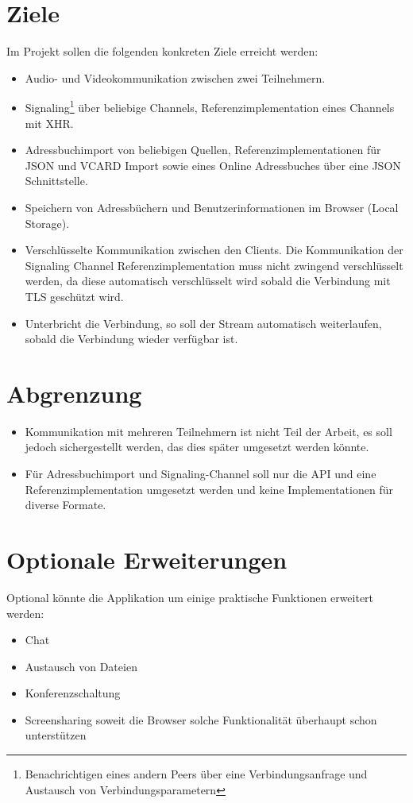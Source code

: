 	\section{Ziele}
		Im Projekt sollen die folgenden konkreten Ziele erreicht werden:
		\begin{itemize}
			\item Audio- und Videokommunikation zwischen zwei Teilnehmern.
			\item Signaling\footnote{Benachrichtigen eines andern Peers über eine Verbindungsanfrage und Austausch von Verbindungsparametern} über beliebige Channels, Referenzimplementation eines Channels mit XHR.
			\item Adressbuchimport von beliebigen Quellen, Referenzimplementationen für JSON und VCARD Import sowie eines Online Adressbuches über eine JSON Schnittstelle.
			\item Speichern von Adressbüchern und Benutzerinformationen im Browser (Local Storage\cite{MDN-LocalStorage}).
			\item Verschlüsselte Kommunikation zwischen den Clients. Die Kommunikation der Signaling Channel Referenzimplementation muss nicht zwingend verschlüsselt werden, da diese automatisch verschlüsselt wird sobald die Verbindung mit TLS geschützt wird.
			\item Unterbricht die Verbindung, so soll der Stream automatisch weiterlaufen, sobald die Verbindung wieder verfügbar ist.
		\end{itemize}
		
	\section{Abgrenzung}
		\begin{itemize}
			\item Kommunikation mit mehreren Teilnehmern ist nicht Teil der Arbeit, es soll jedoch sichergestellt werden, das dies später umgesetzt werden könnte.
			\item Für Adressbuchimport und Signaling-Channel soll nur die API und eine Referenzimplementation umgesetzt werden und keine Implementationen für diverse Formate.
		\end{itemize}
		
		
	\section{Optionale Erweiterungen}
		Optional könnte die Applikation um einige praktische Funktionen erweitert werden:		
		\begin{itemize}
			\item Chat
			\item Austausch von Dateien
			\item Konferenzschaltung
			\item Screensharing soweit die Browser solche Funktionalität überhaupt schon unterstützen
		\end{itemize}
		
